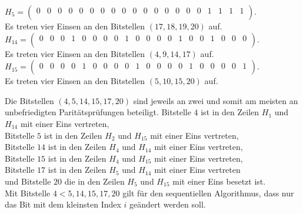 \begin{Beispiel}
    $H_5= \left( \begin{array}{rrrrrrrrrrrrrrrrrrrr}
        0 & 0 & 0 & 0 & 0 & 0 & 0 & 0 & 0 & 0 & 0 & 0 & 0 & 0 & 0 & 0 & 1 & 1 & 1 & 1 \\
       \end{array}\right). 
    $\\
    Es treten vier Einsen an den Bitstellen $(17, 18, 19, 20)$ auf.\\
    
    $H_{14}=\left( \begin{array}{rrrrrrrrrrrrrrrrrrrr}
        0 & 0 & 0 & 1 & 0 & 0 & 0 & 0 & 1 & 0 & 0 & 0 & 0 & 1 & 0 & 0 & 1 & 0 & 0 & 0 \\
       \end{array}\right). 
    $\\
    Es treten vier Einsen an den Bitstellen $(4, 9, 14, 17)$ auf.\\
    
    $H_{15}=\left( \begin{array}{rrrrrrrrrrrrrrrrrrrr}
        0 & 0 & 0 & 0 & 1 & 0 & 0 & 0 & 0 & 1 & 0 & 0 & 0 & 0 & 1 & 0 & 0 & 0 & 0 & 1 \\
       \end{array}\right). 
    $\\
    Es treten vier Einsen an den Bitstellen $(5, 10, 15, 20)$ auf.\\
    \pagebreak
    
    Die Bitstellen $(4, 5, 14, 15, 17, 20)$ sind jeweils an zwei und somit am meisten an unbefriedigten Paritätsprüfungen beteiligt. 
    Bitstelle $4$ ist in den Zeilen $H_1$ und $H_{14}$ mit einer Eins vertreten,\\
    Bitstelle $5$ ist in den Zeilen $H_2$ und $H_{15}$  mit einer Eins vertreten,\\
    Bitstelle $14$ ist in den Zeilen $H_4$ und $H_{14}$  mit einer Eins vertreten,\\ 
    Bitstelle $15$ ist in den Zeilen $H_4$ und $H_{15}$ mit einer Eins vertreten,\\
    Bitstelle $17$ ist in den Zeilen $H_5$ und $H_{14}$ mit einer Eins vertreten\\    
    und Bitstelle $20$ die in den Zeilen $H_5$ und $H_{15}$ mit einer Eins besetzt ist.\\
    Mit Bitstelle $4 < 5, 14, 15, 17, 20$ gilt für den sequentiellen Algorithmus, dass nur das Bit mit dem kleinsten Index $i$ geändert werden soll.\\
    

\end{Beispiel}
